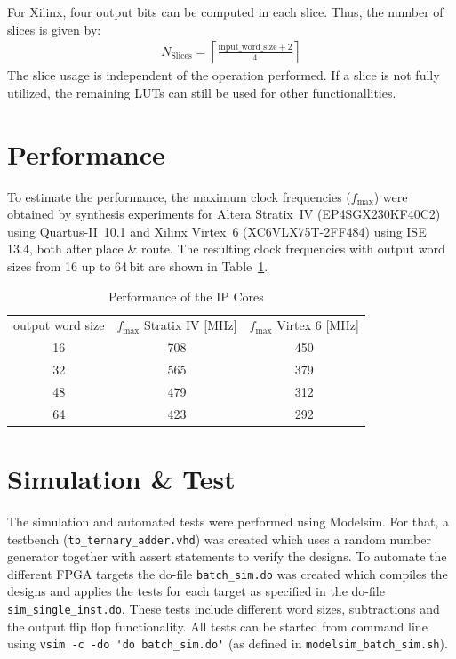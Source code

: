 \documentclass[a4paper,BCOR7mm,12pt,pointlessnumbers,bibtotoc]{scrartcl}
\newcommand{\ceil}[1]{\left\lceil #1 \right\rceil} %
\begin{document}
For Xilinx, four output bits can be computed in each slice. Thus, the number of slices is given by:
\begin{align}
	N_{\text{Slices}} = \ceil{\frac{\text{input\_word\_size}+2}{4}} 
\end{align}
The slice usage is independent of the operation performed. If a slice is not fully utilized, the remaining LUTs can still be used for other functionallities.

\section{Performance}

To estimate the performance, the maximum clock frequencies ($f_\text{max}$) were obtained by synthesis experiments for Altera Stratix~IV (EP4SGX230KF40C2) using Quartus-II~10.1 and Xilinx Virtex~6 (XC6VLX75T-2FF484) using ISE 13.4, both after place \& route. The resulting clock frequencies with output word sizes from 16 up to 64\,bit are shown in Table~\ref{tab:performance}.

\begin{table}[!h]
	\renewcommand{\arraystretch}{1.1}
	\caption{Performance of the IP Cores}
	\label{tab:performance}
	\centering
	\begin{tabular}{ccc}
	  \toprule
      output word size & $f_\text{max}$ Stratix IV [MHz] & $f_\text{max}$ Virtex 6 [MHz]\\
	    \cmidrule(rl){1-1} \cmidrule(rl){2-2} \cmidrule(rl){3-3}
      16 & 708 & 450\\
      32 & 565 & 379\\
      48 & 479 & 312 \\
      64 & 423 & 292\\
    \bottomrule
   \end{tabular}
\end{table}

\section{Simulation \& Test}

The simulation and automated tests were performed using Modelsim. For that, a testbench (\verb|tb_ternary_adder.vhd|) was created which uses a random number generator together with assert statements to verify the designs. To automate the different FPGA targets the do-file \verb|batch_sim.do| was created which compiles the designs and applies the tests for each target as specified in the do-file \verb|sim_single_inst.do|. These tests include different word sizes, subtractions and the output flip flop functionality. All tests can be started from command line using \verb|vsim -c -do 'do batch_sim.do'| (as defined in \verb|modelsim_batch_sim.sh|).



\end{document}
